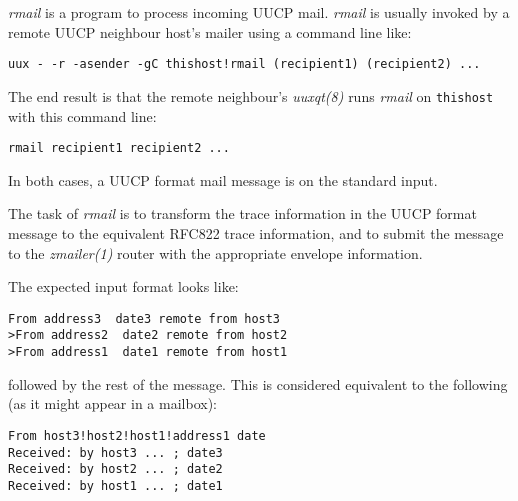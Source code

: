 
{\em rmail\/} is a program to process incoming UUCP mail.
{\em rmail\/} is usually invoked by a remote UUCP neighbour host's
mailer using a command line like:

\begin{tscreen}
\begin{verbatim}
uux - -r -asender -gC thishost!rmail (recipient1) (recipient2) ...
\end{verbatim}
\end{tscreen}


The end result is that the remote neighbour's {\em uuxqt(8)\/} runs
{\em rmail\/} on {\tt thishost} with this command line:

\begin{tscreen}
\begin{verbatim}
rmail recipient1 recipient2 ...
\end{verbatim}
\end{tscreen}


In both cases, a UUCP format mail message is on the standard input.

The task of {\em rmail\/} is to transform the trace information in
the UUCP format message to the equivalent RFC822 trace
information, and to submit the message to the {\em zmailer(1)\/}
router with the appropriate envelope information.

The expected input format looks like:

\begin{tscreen}
\begin{verbatim}
From address3  date3 remote from host3
>From address2  date2 remote from host2
>From address1  date1 remote from host1
\end{verbatim}
\end{tscreen}


followed by the rest of the message. This is considered
equivalent to the following (as it might appear in a mailbox):

\begin{tscreen}
\begin{verbatim}
From host3!host2!host1!address1 date
Received: by host3 ... ; date3
Received: by host2 ... ; date2
Received: by host1 ... ; date1
\end{verbatim}
\end{tscreen}


